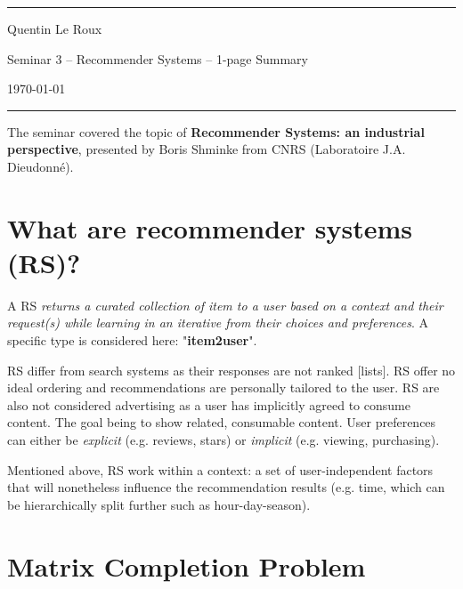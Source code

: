 \documentclass[a4paper]{article}
\begin{document}

\fancyhead[C]{}
\hrule \medskip %
\begin{minipage}{0.24\textwidth} 
\raggedright
\footnotesize
Quentin Le Roux \hfill
\end{minipage}
\begin{minipage}{0.5\textwidth} 
\centering 

Seminar 3 -- Recommender Systems -- 1-page Summary
\end{minipage}
\begin{minipage}{0.245\textwidth} 
\raggedleft
\today
\end{minipage}
\hrule 
\bigskip


The seminar covered the topic of \textbf{Recommender Systems: an industrial perspective}, presented by Boris Shminke from CNRS (Laboratoire J.A. Dieudonné).

\section{What are recommender systems (RS)?}

A RS \textit{returns a curated collection of item to a user based on a context and their request(s) while learning in an iterative from their choices and preferences}. A specific type is considered here: "\textbf{item2user}".

RS differ from search systems as their responses are not ranked [lists]. RS offer no ideal ordering and recommendations are personally tailored to the user. RS are also not considered advertising as a user has implicitly agreed to consume content. The goal being to show related, consumable content. User preferences can either be \textit{explicit} (e.g. reviews, stars) or \textit{implicit} (e.g. viewing, purchasing).

Mentioned above, RS work within a context: a set of user-independent factors that will nonetheless influence the recommendation results (e.g. time, which can be hierarchically split further such as hour-day-season). 


\section{Matrix Completion Problem}
\end{document}
